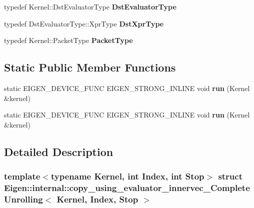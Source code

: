 \begin{DoxyCompactItemize}
typedef Kernel\+::\+Dst\+Evaluator\+Type {\bfseries Dst\+Evaluator\+Type}
\item 
\mbox{\label{struct_eigen_1_1internal_1_1copy__using__evaluator__innervec___complete_unrolling_a6b3dce8ef2f1568a09bf18dc15a15f81}} 
typedef Dst\+Evaluator\+Type\+::\+Xpr\+Type {\bfseries Dst\+Xpr\+Type}
\item 
\mbox{\label{struct_eigen_1_1internal_1_1copy__using__evaluator__innervec___complete_unrolling_a0941896241a59f3dd7d288ae55fd236d}} 
typedef Kernel\+::\+Packet\+Type {\bfseries Packet\+Type}
\end{DoxyCompactItemize}
\subsection*{Static Public Member Functions}
\begin{DoxyCompactItemize}
\item 
\mbox{\label{struct_eigen_1_1internal_1_1copy__using__evaluator__innervec___complete_unrolling_a5d26f02f41e78b2e18e0294a22393ebb}} 
static E\+I\+G\+E\+N\+\_\+\+D\+E\+V\+I\+C\+E\+\_\+\+F\+U\+NC E\+I\+G\+E\+N\+\_\+\+S\+T\+R\+O\+N\+G\+\_\+\+I\+N\+L\+I\+NE void {\bfseries run} (Kernel \&kernel)
\item 
\mbox{\label{struct_eigen_1_1internal_1_1copy__using__evaluator__innervec___complete_unrolling_a5d26f02f41e78b2e18e0294a22393ebb}} 
static E\+I\+G\+E\+N\+\_\+\+D\+E\+V\+I\+C\+E\+\_\+\+F\+U\+NC E\+I\+G\+E\+N\+\_\+\+S\+T\+R\+O\+N\+G\+\_\+\+I\+N\+L\+I\+NE void {\bfseries run} (Kernel \&kernel)
\end{DoxyCompactItemize}


\subsection{Detailed Description}
\subsubsection*{template$<$typename Kernel, int Index, int Stop$>$\newline
struct Eigen\+::internal\+::copy\+\_\+using\+\_\+evaluator\+\_\+innervec\+\_\+\+Complete\+Unrolling$<$ Kernel, Index, Stop $>$}



